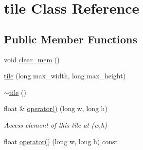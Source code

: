 \hypertarget{classtile}{\section{tile Class Reference}
\label{classtile}
}
\subsection*{Public Member Functions}
\begin{DoxyCompactItemize}
\item 
void \hyperlink{classtile_aba3ebab4ffdbfdb86d9077b6c1510ac3}{clear\-\_\-mem} ()
\item 
\hyperlink{classtile_a4a11ab1e126b8f5a39145836fa15960d}{tile} (long max\-\_\-width, long max\-\_\-height)
\item 
\hyperlink{classtile_afbef14bff799cec1be0b2d504d66507b}{$\sim$tile} ()
\item 
\hypertarget{classtile_aa0eeadf75c401536efe4c07a8ddee4ab}{float \& \hyperlink{classtile_aa0eeadf75c401536efe4c07a8ddee4ab}{operator()} (long w, long h)}\label{classtile_aa0eeadf75c401536efe4c07a8ddee4ab}

\begin{DoxyCompactList}\small\item\em Access element of this tile at (w,h) \end{DoxyCompactList}\item 
\hypertarget{classtile_a9ff4c62c4eafa1e5ad077e60bc9abd0c}{float \hyperlink{classtile_a9ff4c62c4eafa1e5ad077e60bc9abd0c}{operator()} (long w, long h) const }\label{classtile_a9ff4c62c4eafa1e5ad077e60bc9abd0c}


\end{DoxyCompactItemize}
